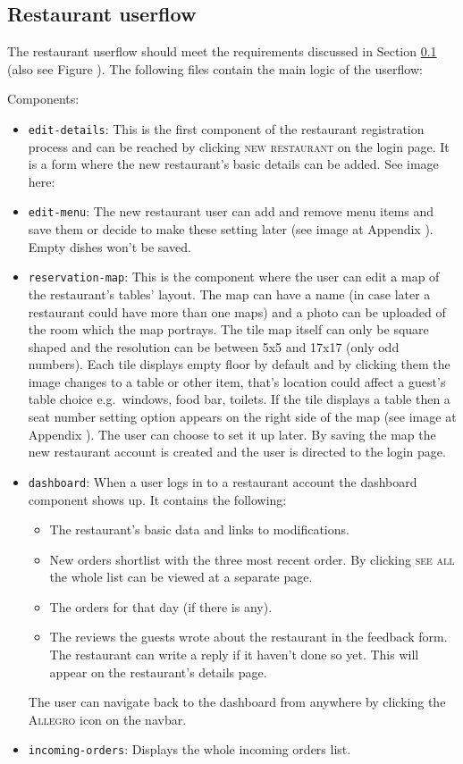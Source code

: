 \subsection{Restaurant userflow}\label{RestaurantUserflow}
 
 The restaurant userflow should meet the requirements discussed in Section \ref{RestaurantUserflow} (also see Figure ). The following files contain the main logic of the userflow:
 
Components:
\begin{itemize}	
	\item \verb+edit-details+: This is the first component of the restaurant registration process and can be reached by clicking \textsc{new restaurant} on the login page.  It is a form where the new restaurant's basic details can be added. See image here: 
	\item \verb+edit-menu+:	The new restaurant user can add and remove menu items and save them or decide to make these setting later (see image at Appendix ). Empty dishes won't be saved.
	\item \verb+reservation-map+: This is the component where the user can edit a map of the restaurant's tables' layout. The map can have a name (in case later a restaurant could have more than one maps) and a photo can be uploaded of the room which the map portrays. The tile map itself can only be square shaped and the resolution can be between 5x5 and 17x17 (only odd numbers). Each tile displays empty floor by default and by clicking them the image changes to a table or other item, that's location could affect a guest's table choice e.g.\ windows, food bar, toilets. If the tile displays a table then a seat number setting option appears on the right side of the map (see image at Appendix ). The user can choose to set it up later. By saving the map the new restaurant account is created and the user is directed to the login page. 
	\item \verb+dashboard+: When a user logs in to a restaurant account the dashboard component shows up. It contains the following:
	\begin{itemize}
		\item The restaurant's basic data and links to modifications.
		\item New orders shortlist with the three most recent order. By clicking \textsc{see all} the whole list can be viewed at a separate page.
		\item The orders for that day (if there is any).
		\item The reviews the guests wrote about the restaurant in the feedback form. The restaurant can write a reply if it haven't done so yet. This will appear on the restaurant's details page.
	\end{itemize}
The user can navigate back to the dashboard from anywhere by clicking the \textsc{Allegro} icon on the navbar.
	\item \verb+incoming-orders+: Displays the whole incoming orders list.
\end{itemize}
